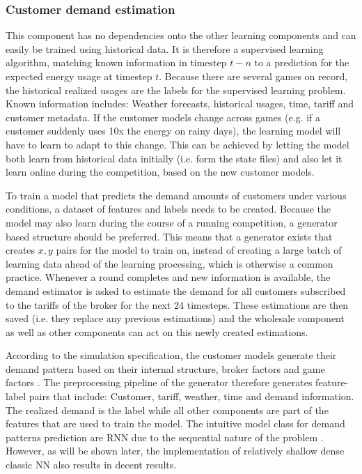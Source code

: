 \subsubsection{Customer demand estimation}%

This component has no dependencies onto the other learning components and can easily be trained using historical data.
It is therefore a supervised learning algorithm, matching known information in timestep $t-n$ to a prediction for the
expected energy usage at timestep $t$. Because there are several games on record, the historical realized usages are the
labels for the supervised learning problem. Known information includes: Weather forecasts, historical usages, time, tariff
and customer metadata.
If the customer models change across games (e.g. if a customer suddenly uses 10x the energy on rainy days), the learning
model will have to learn to adapt to this change. This can be achieved by letting the model both learn from historical
data initially (i.e. form the state files) and also let it learn online during the competition, based on the new
customer models.

To train a model that predicts the demand amounts of customers under various conditions, a dataset of features and
labels needs to be created. Because the model may also learn during the course of a running competition, a generator based structure should be preferred. This means that a generator
exists that creates $x, y$ pairs for the model to train on, instead of creating a large batch of learning data ahead of
the learning processing, which is otherwise a common practice. Whenever a round completes and new information is
available, the demand estimator is asked to estimate the demand for all customers subscribed to the tariffs of the
broker for the next 24 timesteps. These estimations are then saved (i.e. they replace any previous estimations) and the
wholesale component as well as other components can act on this newly created estimations.

According to the simulation specification, the customer models generate their demand pattern based on their internal
structure, broker factors and game factors \citep[]{ketter2018powertac}. The preprocessing pipeline of the generator therefore generates
feature-label pairs that include: Customer, tariff, weather, time and demand information. The realized demand is the
label while all other components are part of the features that are used to train the model. The intuitive model class
for demand patterns prediction are \ac {RNN} due to the sequential nature of the problem \citep[]{EvalGRU2014}. However,
as will be shown later, the implementation of relatively shallow dense classic \ac {NN} also results in decent results.


